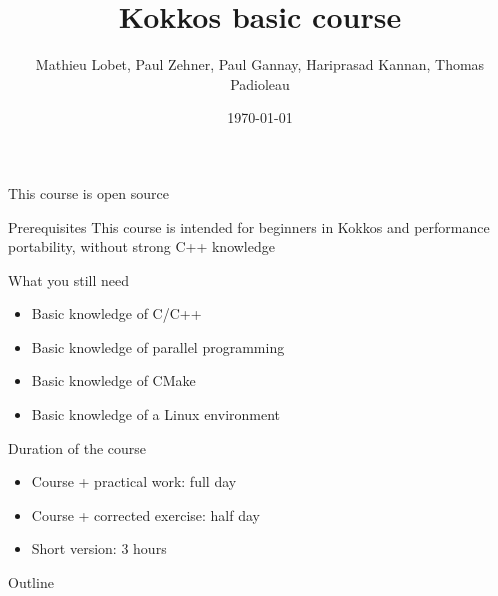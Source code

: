 \documentclass[
    aspectratio=169,
    \createHandout
]{beamer}
\title{Kokkos basic course}
\author{\scriptsize Mathieu Lobet, Paul Zehner, Paul Gannay, Hariprasad Kannan, Thomas Padioleau}
\institute{CEA}
\date{\today}
\renewcommand{\baselinestretch}{0.25}
\begin{document}
\begin{frame}[plain]
    \titlepage
\end{frame}


\begin{frame}{This course is open source}
    \begin{center}
    \end{center}
\end{frame}


\begin{frame}{Prerequisites}
    This course is intended for beginners in Kokkos and performance portability, without strong C++ knowledge

    \vspace{1em}

    \begin{block}{What you still need}
        \begin{itemize}
            \item Basic knowledge of C/C++
            \item Basic knowledge of parallel programming
            \item Basic knowledge of CMake
            \item Basic knowledge of a Linux environment
        \end{itemize}
    \end{block}
\end{frame}


\begin{frame}{Duration of the course}
    \begin{itemize}
        \item Course + practical work: full day
        \item Course + corrected exercise: half day
        \item Short version: 3 hours
    \end{itemize}
\end{frame}

\begin{frame}{Outline}
    \renewcommand{\baselinestretch}{0.5}
    \tableofcontents
\end{frame}
\end{document}
